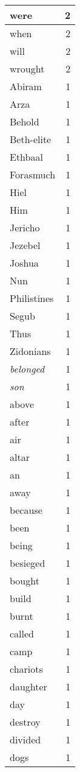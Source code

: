 \begin{center}
\begin{longtable}{l|r}
were & 2 \\ \hline
when & 2 \\ \hline
will & 2 \\ \hline
wrought & 2 \\ \hline
Abiram & 1 \\ \hline
Arza & 1 \\ \hline
Behold & 1 \\ \hline
Beth-elite & 1 \\ \hline
Ethbaal & 1 \\ \hline
Forasmuch & 1 \\ \hline
Hiel & 1 \\ \hline
Him & 1 \\ \hline
Jericho & 1 \\ \hline
Jezebel & 1 \\ \hline
Joshua & 1 \\ \hline
Nun & 1 \\ \hline
Philistines & 1 \\ \hline
Segub & 1 \\ \hline
Thus & 1 \\ \hline
Zidonians & 1 \\ \hline
\emph{belonged} & 1 \\ \hline
\emph{son} & 1 \\ \hline
above & 1 \\ \hline
after & 1 \\ \hline
air & 1 \\ \hline
altar & 1 \\ \hline
an & 1 \\ \hline
away & 1 \\ \hline
because & 1 \\ \hline
been & 1 \\ \hline
being & 1 \\ \hline
besieged & 1 \\ \hline
bought & 1 \\ \hline
build & 1 \\ \hline
burnt & 1 \\ \hline
called & 1 \\ \hline
camp & 1 \\ \hline
chariots & 1 \\ \hline
daughter & 1 \\ \hline
day & 1 \\ \hline
destroy & 1 \\ \hline
divided & 1 \\ \hline
dogs & 1 \\ \hline

\end{longtable}
\end{center}
